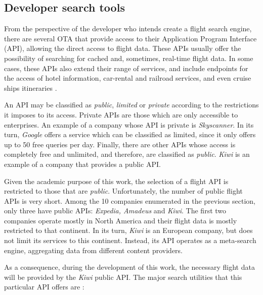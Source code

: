 \subsection{Developer search tools}
\label{sec:developer_st}


From the perspective of the developer who intends create a flight search engine, there are several OTA that provide access to their Application Program Interface (API), allowing the direct access to flight data. These APIs usually offer the possibility of searching for cached and, sometimes, real-time flight data. In some cases, these APIs also extend their range of services, and include endpoints for the access of hotel information, car-rental and railroad services, and even cruise ships itineraries  \cite{expedia_docs, amadeus}.

An API may be classified as \textit{public}, \textit{limited} or \textit{private} according to the restrictions it imposes to its access. Private APIs are those which are only accessible to enterprises. An example of a company whose API is private is \textit{Skyscanner}. In its turn, \textit{Google} offers a service which can be classified as limited, since it only offers up to 50 free queries per day. Finally, there are other APIs whose access is completely free and unlimited, and therefore, are classified as \textit{public}. \textit{Kiwi} is an example of a company that provides a public API.

Given the academic purpose of this work, the selection of a flight API is restricted to those that are \textit{public}. Unfortunately, the number of public flight APIs is very short. Among the 10 companies enumerated in the previous section, only three have public APIs: \textit{Expedia, Amadeus} and \textit{Kiwi}. The first two companies operate mostly in North America and their flight data is mostly restricted to that continent. In its turn, \textit{Kiwi} is an European company, but does not limit its services to this continent. Instead, its API operates as a meta-search engine, aggregating data from different content providers. 

As a consequence, during the development of this work, the necessary flight data will be provided by the \textit{Kiwi} public API. The major search utilities that this particular API offers are \cite{kiwi_api}:

